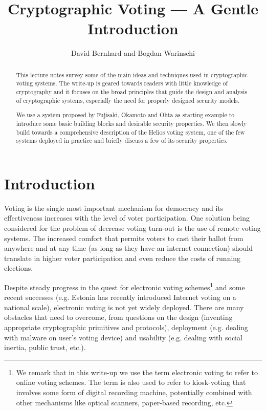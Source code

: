 \documentclass[envcountsame]{llncs}
\title{Cryptographic Voting --- A Gentle Introduction}
\author{David Bernhard and Bogdan Warinschi}
\institute{University of Bristol, England}
\begin{document}
\maketitle

\begin{abstract}
This lecture notes survey some of the main ideas and techniques used in cryptographic voting systems. 
The write-up is geared towards readers with little knowledge of cryptography and it focuses on the broad principles that guide the design and analysis of cryptographic systems, especially the need for properly designed security models.

We use a system proposed by Fujisaki, Okamoto and Ohta as starting example to introduce some basic building blocks and desirable security properties.  We then slowly build towards a comprehensive description of the Helios voting system, one of the few systems deployed in practice and briefly discuss a few of its security properties. 
\end{abstract}

\newpage
\let\oldclearpage\clearpage
\let\clearpage\relax
\setcounter{tocdepth}{2}
\vfil
\tableofcontents
\let\clearpage\oldclearpage
\clearpage




\section{Introduction}
Voting is the single most important mechanism for democracy and its effectiveness increases with the level of voter participation.    
One solution being considered for the problem of decrease voting turn-out is the use of remote voting systems.  The increased comfort that permits voters to cast their ballot from anywhere and at any time (as long as they have an internet connection) should translate in higher voter participation and even reduce the costs of running elections.  

Despite steady progress in the quest for electronic voting schemes\footnote{We remark that in this write-up we use the term electronic voting to refer to online voting schemes. The term is also used to refer to kiosk-voting that involves some form of digital recording machine, potentially combined with other mechanisms like optical scanners, paper-based recording, etc. } and some recent successes (e.g. Estonia has recently introduced Internet voting on a national scale), electronic voting is not yet widely deployed.   There are many obstacles that need to overcome, from questions on the design (inventing appropriate cryptographic primitives and protocols), deployment (e.g. dealing with malware on user's voting device) and usability (e.g. dealing with social inertia, public trust, etc.). 
\end{document}

